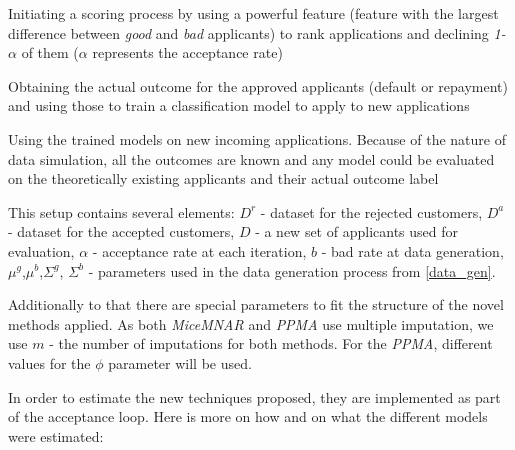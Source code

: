 \documentclass[11pt,a4paper]{article}
\begin{document}
\begin{boxlabel}
\item Initiating a scoring process by using a powerful feature (feature with the largest difference between \textit{good} and \textit{bad} applicants) to rank applications and declining \textit{1-$\alpha$} of them ($\alpha$ represents the acceptance rate)
\item Obtaining the actual outcome for the approved applicants (default or repayment) and using those to train a classification model to apply to new applications
\item Using the trained models on new incoming applications. Because of the nature of data simulation, all the outcomes are known and any model could be evaluated on the theoretically existing applicants and their actual outcome label
\end{boxlabel}


This setup contains several elements: 
$D^r$ - dataset for the rejected customers, 
$D^a$ -  dataset for the accepted customers,
$D$ - a new set of applicants used for evaluation, 
$\alpha$ - acceptance rate at each iteration,
$b$ - bad rate at data generation, 
$\mu^g$,$\mu^b$,$\Sigma^g$, $\Sigma^b$ - parameters used in the data generation process from \ref{data_gen}. 

Additionally to that there are special parameters to fit the structure of the novel methods applied. As both \textit{MiceMNAR} and \textit{PPMA} use multiple imputation, we use $m$ - the number of imputations for both methods. For the \textit{PPMA}, different values for the $\phi$ parameter will be used. 

In order to estimate the new techniques proposed, they are implemented as part of the acceptance loop. Here is more on how and on what the different models were estimated: 
\end{document}
